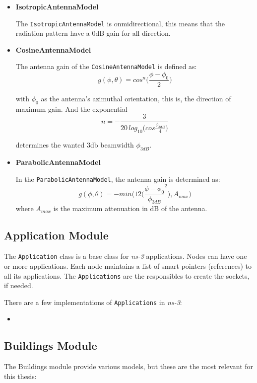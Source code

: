 \begin{itemize}[itemsep=0pt, topsep=0pt]
  \item \textbf{IsotropicAntennaModel} 
  
  The \texttt{IsotropicAntennaModel} is onmidirectional, this means that the radiation pattern have
  a 0dB gain for all direction.
  \item \textbf{CosineAntennaModel}
  
  The antenna gain of the \texttt{CosineAntennaModel} is defined as:
  \begin{equation}
    g(\phi,\theta)=cos^n \bigg( \frac{\phi-\phi_0}{2} \bigg)
  \end{equation}

  with ${\phi_0}$ as the antenna's azimuthal orientation, this is, the direction of maximum gain. And the exponential
  \begin{equation}
    n=-\frac{3}{20\,log_{10} \big( cos\frac{\phi_{3dB}}{4} \big) }
  \end{equation}

  determines the wanted 3db beamwidth ${\phi_{3dB}}$.
  \item \textbf{ParabolicAntennaModel}

  In the \texttt{ParabolicAntennaModel}, the antenna gain is determined as:
  \begin{equation}
    g(\phi,\theta)=-min \bigg( 12 \bigg( \frac{\phi-\phi_0}{\phi_{3dB}}^2 \bigg) ,A_{max} \bigg)
  \end{equation}
  where ${A_{max}}$ is the maximum attenuation in dB of the antenna. 
\end{itemize}

\subsection{Application Module}
The \texttt{Application} class is a base class for \textit{ns-3} applications. Nodes can
have one or more applications. Each node maintains a list of smart pointers (references) 
to all its applications. The \texttt{Applications} are the responsibles to create the sockets,
if needed.

There are a few implementations of \texttt{Applications} in \textit{ns-3}:
\begin{itemize}[notopsep, itemsep=0pt]
  \item 
\end{itemize}

\subsection{Buildings Module}
The Buildings module provide various models, but these are the most relevant for this thesis:

